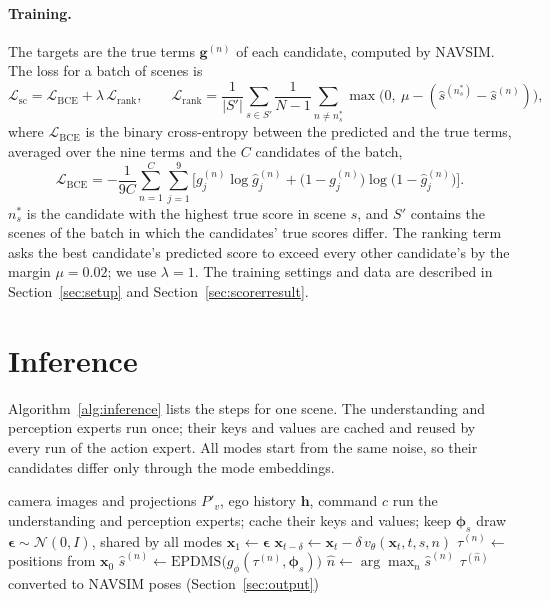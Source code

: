 \documentclass[11pt, a4paper, oneside]{book}
\begin{document}
\paragraph{Training.} The targets are the true terms $\mathbf{g}^{(n)}$ of each candidate,
computed by NAVSIM. The loss for a batch of scenes is
\begin{equation}
  \mathcal{L}_{\mathrm{sc}}=\mathcal{L}_{\mathrm{BCE}}+\lambda\,\mathcal{L}_{\mathrm{rank}},
  \qquad
  \mathcal{L}_{\mathrm{rank}}=\frac{1}{|S'|}\sum_{s\in S'}\frac{1}{N-1}\sum_{n\neq n^\ast_s}
  \max\big(0,\ \mu-(\hat{s}^{(n^\ast_s)}-\hat{s}^{(n)})\big),
\end{equation}
where $\mathcal{L}_{\mathrm{BCE}}$ is the binary cross-entropy between the predicted and the
true terms, averaged over the nine terms and the $C$ candidates of the batch,
\begin{equation}
  \mathcal{L}_{\mathrm{BCE}}=-\frac{1}{9C}\sum_{n=1}^{C}\sum_{j=1}^{9}
  \Big[g^{(n)}_j\log\hat g^{(n)}_j+\big(1-g^{(n)}_j\big)\log\big(1-\hat g^{(n)}_j\big)\Big].
\end{equation}
$n^\ast_s$ is the candidate with the
highest true score in scene $s$, and $S'$ contains the scenes of the batch in which the
candidates' true scores differ. The ranking term asks the best candidate's predicted score to
exceed every other candidate's by the margin $\mu=0.02$; we use $\lambda=1$. The training
settings and data are described in Section~\ref{sec:setup} and Section~\ref{sec:scorerresult}.



\section{Inference}
\label{sec:inference}
Algorithm~\ref{alg:inference} lists the steps for one scene. The understanding and perception
experts run once; their keys and values are cached and reused by every run of the action
expert. All modes start from the same noise, so their candidates differ only through the mode
embeddings.

\begin{algorithm}[ht]
\caption{Inference for one scene}
\label{alg:inference}
\begin{algorithmic}[1]
\Require camera images and projections $P'_v$, ego history $\mathbf h$, command $c$
\State run the understanding and perception experts; cache their keys and values; keep
$\boldsymbol\phi_s$
\State draw $\boldsymbol\epsilon\sim\mathcal{N}(0,I)$, shared by all modes
  \State $\mathbf{x}_1\gets\boldsymbol\epsilon$
    \State $\mathbf{x}_{t-\delta}\gets\mathbf{x}_t-\delta\,v_\theta(\mathbf{x}_t,t,s,n)$
  \EndFor
  \State $\tau^{(n)}\gets$ positions from $\mathbf{x}_0$
  \State $\hat{s}^{(n)}\gets\mathrm{EPDMS}\big(g_\phi(\tau^{(n)},\boldsymbol\phi_s)\big)$
\EndFor
\State $\hat n\gets\arg\max_n\hat{s}^{(n)}$
\State \Return $\tau^{(\hat n)}$ converted to NAVSIM poses (Section~\ref{sec:output})
\end{algorithmic}
\end{algorithm}
\end{document}
